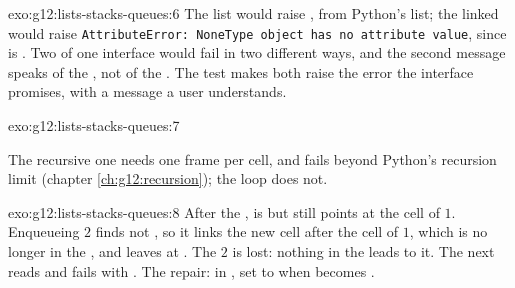 \begin{solution}{exo:g12:lists-stacks-queues:6}
The list  would raise , from Python's list; the linked  would raise
\texttt{AttributeError: \textquotesingle{}NoneType\textquotesingle{} object has no attribute \textquotesingle{}value\textquotesingle{}}, since  is . Two
 of one interface would fail in two different ways, and the second message speaks of the
, not of the . The test makes both raise the error the interface promises, with a message a user
understands.
\end{solution}

\begin{solution}{exo:g12:lists-stacks-queues:7}
\smallskip\noindent\hspace*{2em}

\noindent\hspace*{4em}

\smallskip\noindent\hspace*{2em}

\noindent\hspace*{4em}

\noindent\hspace*{4em}

\noindent\hspace*{6em}

\noindent\hspace*{4em}

\smallskip\noindent The recursive one needs one frame per cell, and fails beyond Python's recursion limit
(chapter \ref{ch:g12:recursion}); the loop does not.
\end{solution}

\begin{solution}{exo:g12:lists-stacks-queues:8}
After the ,  is  but  still points at the cell of $1$. Enqueueing $2$ finds
 not , so it links the new cell after the cell of $1$, which is no longer in the , and
leaves  at . The $2$ is lost: nothing in the  leads to it. The next  reads
 and fails with . The repair: in , set  to
 when  becomes .
\end{solution}

